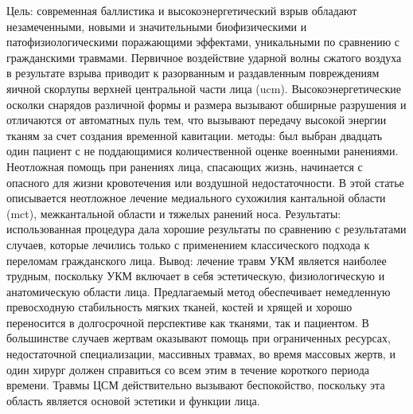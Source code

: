 Цель: современная баллистика и высокоэнергетический взрыв обладают
незамеченными, новыми и значительными биофизическими и патофизиологическими
поражающими эффектами, уникальными по сравнению с гражданскими травмами.
Первичное воздействие ударной волны сжатого воздуха в результате взрыва приводит
к разорванным и раздавленным повреждениям яичной скорлупы верхней центральной
части лица (ucm). Высокоэнергетические осколки снарядов различной формы и
размера вызывают обширные разрушения и отличаются от автоматных пуль тем, что
вызывают передачу высокой энергии тканям за счет создания временной кавитации.
методы: был выбран двадцать один пациент с не поддающимися количественной оценке
военными ранениями. Неотложная помощь при ранениях лица, спасающих жизнь,
начинается с опасного для жизни кровотечения или воздушной недостаточности. В
этой статье описывается неотложное лечение медиального сухожилия кантальной
области (mct), межкантальной области и тяжелых ранений носа. Результаты:
использованная процедура дала хорошие результаты по сравнению с результатами
случаев, которые лечились только с применением классического подхода к переломам
гражданского лица. Вывод: лечение травм УКМ является наиболее трудным, поскольку
УКМ включает в себя эстетическую, физиологическую и анатомическую области лица.
Предлагаемый метод обеспечивает немедленную превосходную стабильность мягких
тканей, костей и хрящей и хорошо переносится в долгосрочной перспективе как
тканями, так и пациентом. В большинстве случаев жертвам оказывают помощь при
ограниченных ресурсах, недостаточной специализации, массивных травмах, во время
массовых жертв, и один хирург должен справиться со всем этим в течение короткого
периода времени. Травмы ЦСМ действительно вызывают беспокойство, поскольку эта
область является основой эстетики и функции лица.\cite{30728703}

